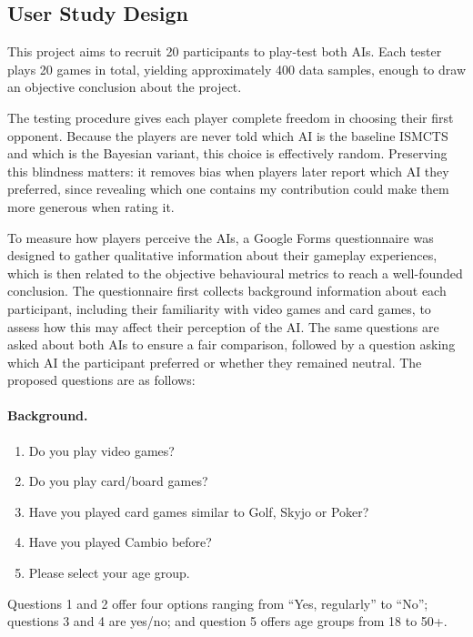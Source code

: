 \documentclass[12pt,a4paper,oneside]{report}
\begin{document}
\subsection{User Study Design}
This project aims to recruit 20 participants to play-test both AIs. Each tester plays
20 games in total, yielding approximately 400 data samples,
enough to draw an objective conclusion about the project.

The testing procedure gives each player complete freedom in choosing their first
opponent. Because the players are never told which AI is the baseline ISMCTS and
which is the Bayesian variant, this choice is effectively random. Preserving this
blindness matters: it removes bias when players later report which AI they
preferred, since revealing which one contains my contribution could make them more
generous when rating it.

To measure how players perceive the AIs, a Google Forms questionnaire was designed to gather qualitative information about their gameplay experiences, which is then related to the objective behavioural metrics to reach a well-founded conclusion. The questionnaire first collects background information about each participant, including their familiarity with video games and card games, to assess how this may affect their perception of the AI. The same questions are asked about both AIs to ensure a fair comparison, followed by a question asking which AI the participant preferred or whether they remained neutral. The proposed questions are as follows:

\paragraph{Background.}
\begin{enumerate}
  \item Do you play video games?
  \item Do you play card/board games?
  \item Have you played card games similar to Golf, Skyjo or Poker?
  \item Have you played Cambio before?
  \item Please select your age group.
\end{enumerate}
Questions 1 and 2 offer four options ranging from ``Yes, regularly'' to ``No'';
questions 3 and 4 are yes/no; and question 5 offers age groups from 18 to 50+.
\end{document}

